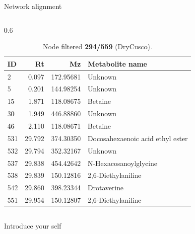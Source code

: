 \documentclass[aspectratio=169]{beamer}
\begin{document}
\begin{frame}{Network alignment}
\begin{columns}[t]
            \begin{column}{0.6\textwidth}
                \begin{table}[htp!]
                    \scriptsize
                    \centering
                    \caption{Node filtered \textbf{294/559} (DryCusco).}
                    \begin{tabular}{lrrl}\toprule
                        ID & Rt & Mz & Metabolite name \\\midrule
                        2	& 0.097	& 172.95681 & Unknown \\
                        5	& 0.201	& 144.98254 & Unknown \\
                        15	& 1.871	& 118.08675 & Betaine \\
                        30	& 1.949	& 446.88860 & Unknown \\
                        46 &	2.110	& 118.08671	& Betaine \\
                        531	& 29.792	& 374.30350 & Docosahexaenoic acid ethyl ester \\
                        532	& 29.794	& 352.32167 & Unknown \\
                        537	& 29.838	& 454.42642 & N-Hexacosanoylglycine \\
                        538	& 29.839	& 150.12816 & 2,6-Diethylaniline \\
                        542	& 29.860	& 398.23344 & Drotaverine \\
                        551	& 29.954	& 150.12807 & 2,6-Diethylaniline \\\bottomrule
                    \end{tabular}
                \end{table}
            \end{column}
        \end{columns}

        \begin{note}
            {Introduce your self}
        \end{note}
    \end{frame}
\end{document}
